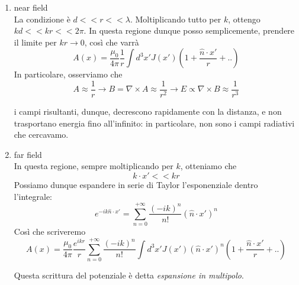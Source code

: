 \documentclass{report}
\begin{document}
    \begin{enumerate}
        \item near field \\

        La condizione è $d << r << \lambda$. Moltiplicando tutto per $k$, ottengo 
        $kd << kr << 2\pi$. In questa regione dunque posso semplicemente, prendere il limite per $kr \rightarrow0$, così che varrà 
        \begin{equation}
            A(x) = \frac{\mu_0}{4\pi}\frac{1}{r}\int d^3x' J(x')\left(1 + \frac{\hat{n}\cdot x'}{r}+ .. \right)
        \end{equation}
        In particolare, osserviamo che 
        \begin{equation}
            A \approx \frac{1}{r} \rightarrow B = \nabla \times A \approx \frac{1}{r^2} \rightarrow E \propto \nabla \times B \approx \frac{1}{r^3}
        \end{equation}

        i campi risultanti, dunque, decrescono rapidamente con la distanza, e non trasportano energia fino all'infinito: in particolare, non sono i campi radiativi che cercavamo. 

        \item far field \\
        In questa regione, sempre moltiplicando per $k$, otteniamo che 
        \begin{equation}
            k\cdot x' << kr
        \end{equation}
        Possiamo dunque espandere in serie di Taylor l'esponenziale dentro l'integrale: 
        \begin{equation}
            e^{-ik\hat{n}\cdot x'} = \sum_{n=0}^{+\infty}\frac{(-ik)^n}{n!}(\hat{n}\cdot x')^n
        \end{equation}
        Così che scriveremo
        \begin{equation}
            A(x) = \frac{\mu_0}{4\pi}\frac{e^{ikr}}{r}\sum_{n=0}^{+\infty}\frac{(-ik)^n}{n!}\int d^3x' J(x')(\hat{n}\cdot x')^n\left(1 + \frac{\hat{n}\cdot x'}{r} + ..\right) 
        \end{equation}

        Questa scrittura del potenziale è detta \emph{espansione in multipolo}. \\

\end{enumerate}
\end{document}
